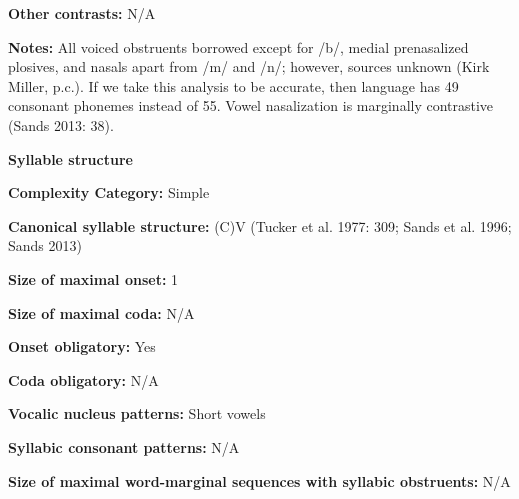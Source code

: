 \begin{styleBody}
\textbf{Other contrasts: }N/A
\end{styleBody}

\begin{styleBody}
\textbf{Notes:} All voiced obstruents borrowed except for /b/, medial prenasalized plosives, and nasals apart from /m/ and /n/; however, sources unknown (Kirk Miller, p.c.). If we take this analysis to be accurate, then language has 49 consonant phonemes instead of 55. Vowel nasalization is marginally contrastive (Sands 2013: 38).
\end{styleBody}

\begin{styleBody}
\textbf{Syllable structure}
\end{styleBody}

\begin{styleBody}
\textbf{Complexity Category:} Simple
\end{styleBody}

\begin{styleBody}
\textbf{Canonical syllable structure:} (C)V\textbf{ }(Tucker et al. 1977: 309; Sands et al. 1996; Sands 2013)
\end{styleBody}

\begin{styleBody}
\textbf{Size of maximal onset:} 1
\end{styleBody}

\begin{styleBody}
\textbf{Size of maximal coda:} N/A
\end{styleBody}

\begin{styleBody}
\textbf{Onset obligatory:} Yes
\end{styleBody}

\begin{styleBody}
\textbf{Coda obligatory:} N/A
\end{styleBody}

\begin{styleBody}
\textbf{Vocalic nucleus patterns:} Short vowels
\end{styleBody}

\begin{styleBody}
\textbf{Syllabic consonant patterns:} N/A
\end{styleBody}

\begin{styleBody}
\textbf{Size of maximal word{}-marginal sequences with syllabic obstruents:} N/A
\end{styleBody}

